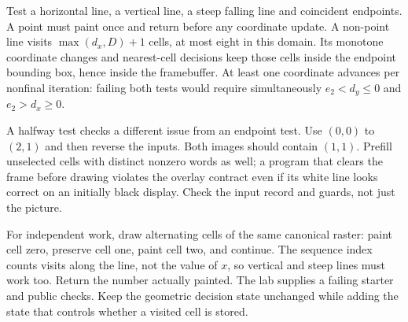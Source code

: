 Test a horizontal line, a vertical line, a steep falling line and coincident
endpoints. A point must paint once and return before any coordinate update. A
non-point line visits $\max(d_x,D)+1$ cells, at most eight in this domain. Its
monotone coordinate changes and nearest-cell decisions keep those cells inside
the endpoint bounding box, hence inside the framebuffer. At least one coordinate
advances per nonfinal iteration: failing both tests would require simultaneously
$e_2<d_y\leq0$ and $e_2>d_x\geq0$.

A halfway test checks a different issue from an endpoint test. Use $(0,0)$ to
$(2,1)$ and then reverse the inputs. Both images should contain $(1,1)$. Prefill
unselected cells with distinct nonzero words as well; a program that clears the
frame before drawing violates the overlay contract even if its white line looks
correct on an initially black display. Check the input record and guards, not just
the picture.

For independent work, draw alternating cells of the same canonical raster: paint
cell zero, preserve cell one, paint cell two, and continue. The sequence index
counts visits along the line, not the value of $x$, so vertical and steep lines
must work too. Return the number actually painted. The lab supplies a failing
starter and public checks. Keep the geometric decision state unchanged while
adding the state that controls whether a visited cell is stored.
